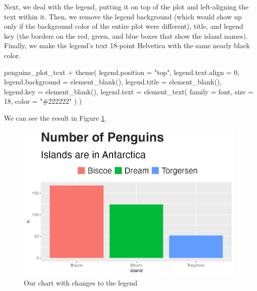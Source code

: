 \documentclass[
]{book}
\newenvironment{Shaded}{\begin{snugshade}}{\end{snugshade}}
\newcommand{\AttributeTok}[1]{\textcolor[rgb]{0.77,0.63,0.00}{#1}}
\newcommand{\DecValTok}[1]{\textcolor[rgb]{0.00,0.00,0.81}{#1}}
\newcommand{\FunctionTok}[1]{\textcolor[rgb]{0.00,0.00,0.00}{#1}}
\newcommand{\NormalTok}[1]{#1}
\newcommand{\SpecialCharTok}[1]{\textcolor[rgb]{0.00,0.00,0.00}{#1}}
\newcommand{\StringTok}[1]{\textcolor[rgb]{0.31,0.60,0.02}{#1}}
\begin{document}
Next, we deal with the legend, putting it on top of the plot and left-aligning the text within it. Then, we remove the legend background (which would show up only if the background color of the entire plot were different), title, and legend key (the borders on the red, green, and blue boxes that show the island names). Finally, we make the legend's text 18-point Helvetica with the same nearly black color.

\begin{Shaded}
\begin{Highlighting}[]
\NormalTok{penguins\_plot\_text }\SpecialCharTok{+}
  \FunctionTok{theme}\NormalTok{(}
    \AttributeTok{legend.position =} \StringTok{"top"}\NormalTok{,}
    \AttributeTok{legend.text.align =} \DecValTok{0}\NormalTok{,}
    \AttributeTok{legend.background =} \FunctionTok{element\_blank}\NormalTok{(),}
    \AttributeTok{legend.title =} \FunctionTok{element\_blank}\NormalTok{(),}
    \AttributeTok{legend.key =} \FunctionTok{element\_blank}\NormalTok{(),}
    \AttributeTok{legend.text =} \FunctionTok{element\_text}\NormalTok{(}
      \AttributeTok{family =}\NormalTok{ font,}
      \AttributeTok{size =} \DecValTok{18}\NormalTok{,}
      \AttributeTok{color =} \StringTok{"\#222222"}
\NormalTok{    )}
\NormalTok{  )}
\end{Highlighting}
\end{Shaded}

We can see the result in Figure \ref{fig:penguins-plot-legend-plot}.

\begin{figure}
\includegraphics[width=1\linewidth]{custom-theme_files/figure-latex/penguins-plot-legend-plot-1} \caption{Our chart with changes to the legend}\label{fig:penguins-plot-legend-plot}
\end{figure}
\end{document}
